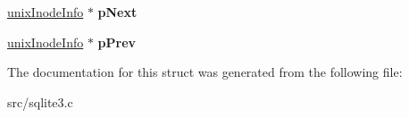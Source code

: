 \begin{DoxyCompactItemize}
\item 
\hypertarget{structunix_inode_info_a80181ba4ef71dd0d8e55e97baedc761e}{\hyperlink{structunix_inode_info}{unix\-Inode\-Info} $\ast$ {\bfseries p\-Next}}\label{structunix_inode_info_a80181ba4ef71dd0d8e55e97baedc761e}

\item 
\hypertarget{structunix_inode_info_a6575edce9898b48870c6f48047c01d01}{\hyperlink{structunix_inode_info}{unix\-Inode\-Info} $\ast$ {\bfseries p\-Prev}}\label{structunix_inode_info_a6575edce9898b48870c6f48047c01d01}

\end{DoxyCompactItemize}


The documentation for this struct was generated from the following file\-:\begin{DoxyCompactItemize}
\item 
src/sqlite3.\-c\end{DoxyCompactItemize}

